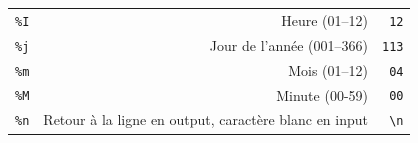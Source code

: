 \documentclass[12pt,]{book}
\numberwithin{equation}{section}
\numberwithin{countremarque}{section}
\begin{document}
\begin{longtable}[]{@{}rrr@{}}
\begin{minipage}[t]{0.10\columnwidth}\raggedleft\strut
\texttt{\%I}\strut
\end{minipage} & \begin{minipage}[t]{0.60\columnwidth}\raggedleft\strut
Heure (01--12)\strut
\end{minipage} & \begin{minipage}[t]{0.22\columnwidth}\raggedleft\strut
\texttt{12}\strut
\end{minipage}\tabularnewline
\begin{minipage}[t]{0.10\columnwidth}\raggedleft\strut
\texttt{\%j}\strut
\end{minipage} & \begin{minipage}[t]{0.60\columnwidth}\raggedleft\strut
Jour de l'année (001--366)\strut
\end{minipage} & \begin{minipage}[t]{0.22\columnwidth}\raggedleft\strut
\texttt{113}\strut
\end{minipage}\tabularnewline
\begin{minipage}[t]{0.10\columnwidth}\raggedleft\strut
\texttt{\%m}\strut
\end{minipage} & \begin{minipage}[t]{0.60\columnwidth}\raggedleft\strut
Mois (01--12)\strut
\end{minipage} & \begin{minipage}[t]{0.22\columnwidth}\raggedleft\strut
\texttt{04}\strut
\end{minipage}\tabularnewline
\begin{minipage}[t]{0.10\columnwidth}\raggedleft\strut
\texttt{\%M}\strut
\end{minipage} & \begin{minipage}[t]{0.60\columnwidth}\raggedleft\strut
Minute (00-59)\strut
\end{minipage} & \begin{minipage}[t]{0.22\columnwidth}\raggedleft\strut
\texttt{00}\strut
\end{minipage}\tabularnewline
\begin{minipage}[t]{0.10\columnwidth}\raggedleft\strut
\texttt{\%n}\strut
\end{minipage} & \begin{minipage}[t]{0.60\columnwidth}\raggedleft\strut
Retour à la ligne en output, caractère blanc en input\strut
\end{minipage} & \begin{minipage}[t]{0.22\columnwidth}\raggedleft\strut
\texttt{\textbackslash{}n}\strut

\end{minipage}
\end{longtable}
\end{document}
